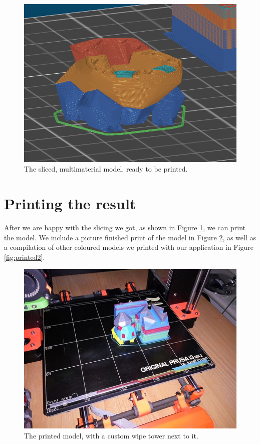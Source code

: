 \begin{figure}
	\centering
	\includegraphics[scale=0.6]{images/sliced.png}
	\caption{The sliced, multimaterial model, ready to be printed.}
	\label{fig:sliced}
\end{figure}

\section{Printing the result}

After we are happy with the slicing we got, as shown in Figure \ref{fig:sliced}, we can print the model. We include a picture finished print of the model in Figure \ref{fig:printed1}, as well as a compilation of other coloured models we printed with our application in Figure \ref{fig:printed2}.

\begin{figure}
	\centering
	\includegraphics[scale=0.6]{images/printed_bulba.jpg}
	\caption{The printed model, with a custom wipe tower next to it.}
	\label{fig:printed1}
\end{figure}

